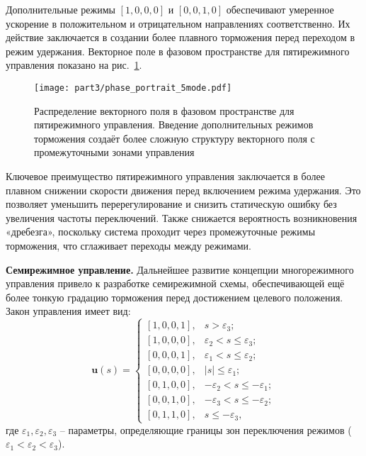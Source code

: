 Дополнительные режимы $[1,0,0,0]$ и $[0,0,1,0]$ обеспечивают умеренное ускорение в положительном и отрицательном направлениях соответственно.
Их действие заключается в создании более плавного торможения перед переходом в режим удержания.
Векторное поле в фазовом пространстве для пятирежимного управления показано на рис.~\ref{fig:vector_field_linear_5mode}.

\begin{figure}[ht]
	\centering
	\texttt{[image: part3/phase\_portrait\_5mode.pdf]}
	\caption{Распределение векторного поля в фазовом пространстве для пятирежимного управления.
		Введение дополнительных режимов торможения создаёт более сложную структуру векторного поля с промежуточными зонами управления}
	\label{fig:vector_field_linear_5mode}
\end{figure}

Ключевое преимущество пятирежимного управления заключается в более плавном снижении скорости движения перед
включением режима удержания. Это позволяет уменьшить перерегулирование и снизить статическую ошибку без увеличения
частоты переключений. Также снижается вероятность возникновения «дребезга», поскольку система проходит
через промежуточные режимы торможения, что сглаживает переходы между режимами.

\textbf{Семирежимное управление.}
Дальнейшее развитие концепции многорежимного управления привело к разработке семирежимной схемы,
обеспечивающей ещё более тонкую градацию торможения перед достижением целевого положения.
Закон управления имеет вид:
\begin{equation}\label{eq:control_law_7_mode}
	\mathbf{u}(s) = \begin{cases}
		[1,0,0,1], & s > \varepsilon_3                     ; \\
		[1,0,0,0], & \varepsilon_2 < s \leq \varepsilon_3 ;  \\
		[0,0,0,1], & \varepsilon_1 < s \leq \varepsilon_2 ;  \\
		[0,0,0,0], & |s| \leq \varepsilon_1          ;       \\
		[0,1,0,0], & -\varepsilon_2 < s \leq -\varepsilon_1; \\
		[0,0,1,0], & -\varepsilon_3 < s \leq -\varepsilon_2; \\
		[0,1,1,0], & s \leq -\varepsilon_3,
	\end{cases}
\end{equation}
где $\varepsilon_1, \varepsilon_2, \varepsilon_3$ -- параметры, определяющие границы зон переключения режимов ($\varepsilon_1 < \varepsilon_2 < \varepsilon_3$).


